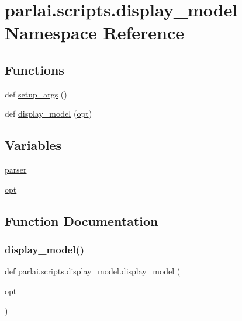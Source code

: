 \hypertarget{namespaceparlai_1_1scripts_1_1display__model}{}\section{parlai.\+scripts.\+display\+\_\+model Namespace Reference}
\label{namespaceparlai_1_1scripts_1_1display__model}
\subsection*{Functions}
\begin{DoxyCompactItemize}
\item 
def \hyperlink{namespaceparlai_1_1scripts_1_1display__model_a9141f8dde0f690b4d641fe08c193e2b5}{setup\+\_\+args} ()
\item 
def \hyperlink{namespaceparlai_1_1scripts_1_1display__model_a25488b354b0b8cbaee28b146b17c26f1}{display\+\_\+model} (\hyperlink{namespaceparlai_1_1scripts_1_1display__model_aadbab63ca2cd3e3e041342c186b88c85}{opt})
\end{DoxyCompactItemize}
\subsection*{Variables}
\begin{DoxyCompactItemize}
\item 
\hyperlink{namespaceparlai_1_1scripts_1_1display__model_ad9d13419b9305a82345edfdda0421c58}{parser}
\item 
\hyperlink{namespaceparlai_1_1scripts_1_1display__model_aadbab63ca2cd3e3e041342c186b88c85}{opt}
\end{DoxyCompactItemize}


\subsection{Function Documentation}
\mbox{\label{namespaceparlai_1_1scripts_1_1display__model_a25488b354b0b8cbaee28b146b17c26f1}} 
\subsubsection{\texorpdfstring{display\+\_\+model()}{display\_model()}}
{\footnotesize\ttfamily def parlai.\+scripts.\+display\+\_\+model.\+display\+\_\+model (\begin{DoxyParamCaption}\item[{}]{opt }\end{DoxyParamCaption})}



